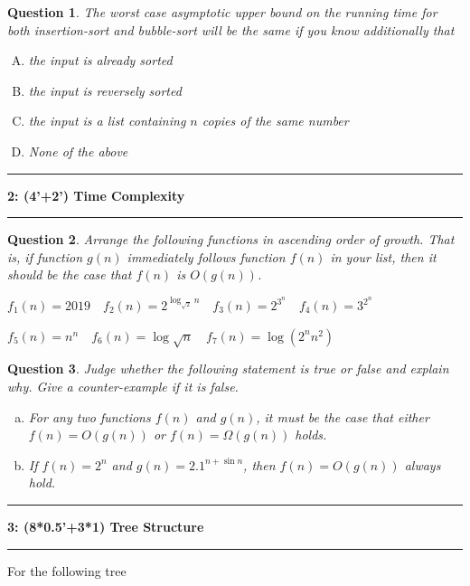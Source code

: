 \documentclass[10.5pt]{article}
\newcommand\question[2]{\vspace{.25in}\hrule\textbf{#1: #2}\vspace{.5em}\hrule\vspace{.10in}}
\newtheorem{Q}{Question}
\begin{document}
	\begin{Q}
		The worst case asymptotic upper bound on the running time for both insertion-sort and bubble-sort will be the same if you know additionally that
		\begin{enumerate}[(A)]
			\item the input is already sorted
			\item the input is reversely sorted
			\item the input is a list containing $n$ copies of the same number
			\item None of the above
		\end{enumerate}
	\end{Q}
		
	\question{2}{(4'+2') Time Complexity}
	\begin{Q}
		Arrange the following functions in ascending order of growth. That is, if function $g(n)$ immediately
		follows function $f(n)$ in your list, then it should be the case that $f(n)$ is $O(g(n))$.
		
		$f_1(n)=2019\quad f_2(n)=2^{\log_{\sqrt{2}}n}\quad f_3(n)=2^{3^n}\quad f_4(n)=3^{2^n}$
		
		$f_5(n)=n^n\quad f_6(n)=\log \sqrt{n}\quad f_7(n)=\log (2^n n^2)$
	\end{Q}
	
	
	\begin{Q}
		Judge whether the following statement is true or false and explain why. Give a counter-example if it is false.
		\begin{enumerate}[(a)]
			\item For any two functions $f(n)$ and $g(n)$, it must be the case that either $f(n) = O(g(n))$ or $f(n) = \Omega(g(n))$ holds.
			\item If $f(n)=2^n$ and $g(n)=2.1^{n+\sin n}$, then $f(n) = O(g(n))$ always hold.
		\end{enumerate}
	\end{Q}

	\pagebreak
	\question{3}{(8*0.5'+3*1) Tree Structure}
	For the following tree
	
	
\end{document}
